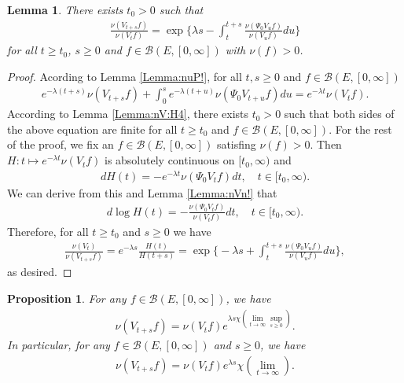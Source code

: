 \documentclass[12pt,a4paper]{amsart}
\numberwithin{equation}{section}
\theoremstyle{plain}
\newtheorem{lem}[thm]{Lemma}
\newtheorem{prop}[thm]{Proposition}
\theoremstyle{definition}
\theoremstyle{remark}
\begin{document}
\begin{lem} \label{Lemma:nVI:H4}
There exists $t_0>0$ such that
\begin{align}
  \frac{\nu(V_{t+s} f)} {\nu(V_t f)}
  = \exp\Big\{ \lambda s - \int_t^{t+s} \frac{\nu(\Psi_0 V_u f) }{\nu(V_u f)} du\Big\}
  \end{align}
for all $t\ge t_0$, $s\geq 0$ and $f \in \mathcal B(E,[0,\infty])$ with $\nu(f)>0$.
\end{lem}
\begin{proof}
Acording to Lemma \ref{Lemma:nuP!}, for all $t, s\geq 0$ and $f\in \mathcal B(E,[0,\infty])$
\begin{align}
  e^{- \lambda (t+s)}\nu(V_{t+s}f) + \int_0^s e^{- \lambda (t+u)} \nu(\Psi_0 V_{t+u}f)du
  = e^{- \lambda t} \nu(V_tf).
  \end{align}
According to Lemma \ref{Lemma:nV:H4}, there exists $t_0> 0$ such that both sides of the above equation are finite for all $t\geq t_0$ and $f\in \mathcal B(E,[0,\infty])$.
For the rest of the proof, we fix an $f \in \mathcal B(E,[0,\infty])$ satisfing $\nu(f)>0$.
Then $H: t\mapsto e^{-\lambda t}\nu(V_tf)$ is absolutely continuous on $[t_0,\infty)$ and
\begin{align}
  d H(t)
  = - e^{- \lambda t} \nu(\Psi_0 V_t f) dt,
  \quad t\in [t_0,\infty).
  \end{align}
We can derive from this and Lemma \ref{Lemma:nVn!} that
\begin{align}
  d \log H(t)
  = - \frac{\nu(\Psi_0 V_tf )}{ \nu(V_tf)} dt,
  \quad t \in [t_0,\infty).
  \end{align}
Therefore, for all $t\geq t_0$ and $s\geq 0$ we have
\begin{align}
  \frac{\nu(V_t)}{ \nu(V_{t+s}f)}
  = e^{- \lambda s} \frac{H(t)}{H(t+s)}
  = \exp\Big\{-\lambda s + \int_t^{t+s} \frac{\nu(\Psi_0 V_u f)}{ \nu(V_u f)} du\Big\},
  \end{align}
as desired.
\end{proof}
\begin{prop} \label{Proposition:nVR:H1:H2:H3:H4}
For any $f\in \mathcal B(E,[0,\infty])$, we have
\begin{align}
\nu(V_{t+s}f) = \nu(V_tf) e^{\lambda s \chi(\lim_{t\to \infty} \sup_{s\geq 0})}.
\end{align}
In particular, for any $f\in \mathcal B(E,[0,\infty])$ and $s\geq 0$, we have
\begin{align}
\nu(V_{t+s}f)
= \nu(V_t f) e^{\lambda s} \chi(\lim_{t\to \infty}).
\end{align}
\end{prop}
\end{document}
